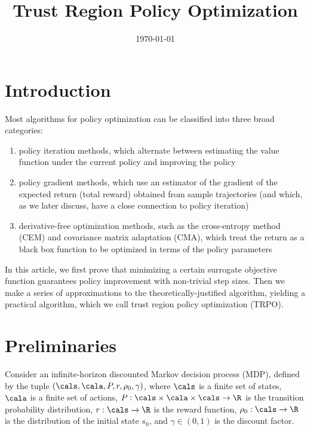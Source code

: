 \documentclass[11pt]{article}
\date{\today}
\title{Trust Region Policy Optimization}
\begin{document}
\maketitle
\section{Introduction}
\label{sec:org01fd29a}
Most algorithms for policy optimization can be classified into three broad categories:
\begin{enumerate}
\item policy iteration methods, which alternate between estimating the value function under the current
policy and improving the policy
\item policy gradient methods, which use an estimator of the gradient of the expected return (total
reward) obtained from sample trajectories (and which, as we later discuss, have a close connection
to policy iteration)
\item derivative-free optimization methods, such as the cross-entropy method (CEM) and covariance matrix
adaptation (CMA), which treat the return as a black box function to be optimized in terms of the
policy parameters
\end{enumerate}


In this article, we first prove that minimizing a certain surrogate objective function guarantees
policy improvement with non-trivial step sizes. Then we make a series of approximations to the
theoretically-justified algorithm, yielding a practical algorithm, which we call trust region policy
optimization (TRPO).
\section{Preliminaries}
\label{sec:org73adcea}
Consider an infinite-horizon discounted Markov decision process (MDP), defined by the tuple
\((\cals,\cala,P,r,\rho_0,\gamma)\), where \(\cals\) is a finite set of states, \(\cala\) is a finite set of actions,
\(P:\cals\times\cala\times\cals\to\R\) is the transition probability distribution, \(r:\cals\to\R\) is the reward function,
\(\rho_0:\cals\to\R\) is the distribution of the initial state \(s_0\), and \(\gamma\in(0,1)\) is the discount factor.

\end{document}
